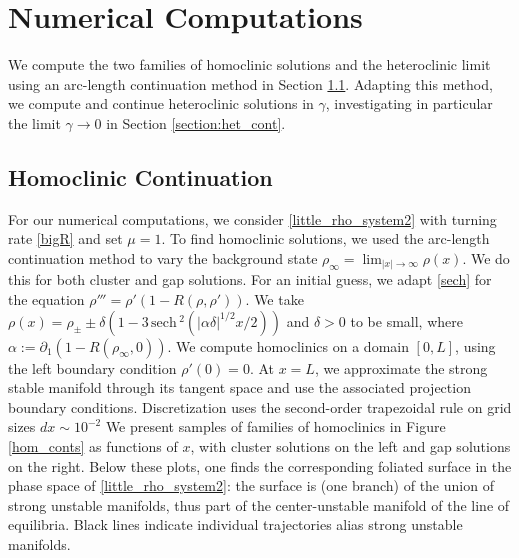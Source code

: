\documentclass[10pt]{article}
\newcommand{\sech}{\,\mathrm{sech}\,}
\begin{document}
\section{Numerical Computations}
\label{section:numerics}
We compute the two families of homoclinic solutions and the heteroclinic limit using an arc-length continuation method in Section \ref{section:hom_cont}.  Adapting this method, we  compute and continue heteroclinic solutions  in $\gamma$, investigating in particular the limit $\gamma \to 0$ in Section \ref{section:het_cont}.  

\subsection{Homoclinic Continuation}
\label{section:hom_cont}
For our numerical computations, we consider \eqref{little_rho_system2} with turning rate  \eqref{bigR} and set $\mu = 1$. To find homoclinic solutions, we used the arc-length continuation method to vary the background state  $\rho_\infty =\lim_{|x|\to\infty} \rho(x)$. We do this for both cluster and gap solutions.  For an initial guess, we adapt \eqref{sech} for the equation $\rho''' = \rho'(1-R(\rho,\rho'))$.  We take $\rho(x) = \rho_\pm \pm \delta(1-3\sech^2(|\alpha\delta|^{1/2} x/2))$ and $\delta> 0$ to be small, where  $\alpha := \partial_1(1-R(\rho_\infty,0))$.  We compute homoclinics on a domain $[0,L]$, using the left boundary condition $\rho'(0) = 0$. At $x=L$, we approximate the strong stable manifold through its tangent space and use the associated projection boundary conditions. Discretization uses the second-order trapezoidal rule on grid sizes $dx\sim 10^{-2}$ We present samples of families of homoclinics in Figure \ref{hom_conts} as functions of $x$, with cluster solutions on the left and gap solutions on the right.  Below these plots, one finds the corresponding foliated surface in the phase space of \eqref{little_rho_system2}: the surface is (one branch) of the union of strong unstable manifolds, thus part of the center-unstable manifold of the line of equilibria. Black lines indicate individual trajectories alias strong unstable manifolds. 

\end{document}
